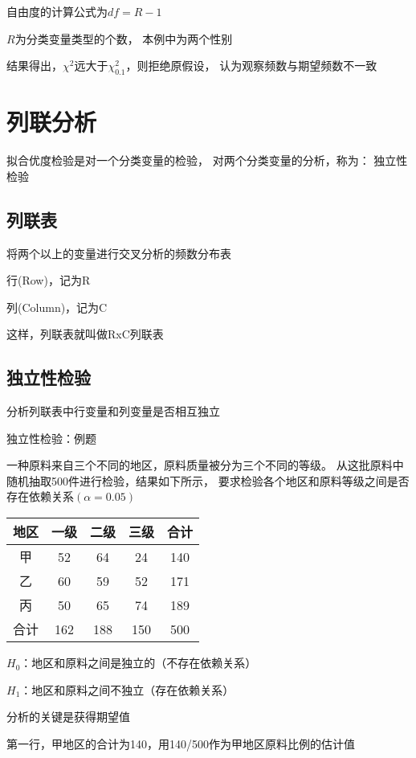 \documentclass[UTF8,10pt]{book}
\begin{document}
{\begin{enumerate}
	自由度的计算公式为$df = R - 1 $
\end{enumerate}  

$R$为分类变量类型的个数，
本例中为两个性别 

结果得出，$\chi^2$远大于$\chi_{0.1}^2$，则拒绝原假设，
认为观察频数与期望频数不一致	

\section{列联分析}
拟合优度检验是对一个分类变量的检验， 对两个分类变量的分析，称为：	独立性检验	

\subsection{列联表}	
将两个以上的变量进行交叉分析的频数分布表 

行(Row)，记为R 

列(Column)，记为C 

这样，列联表就叫做RxC列联表	

\subsection{独立性检验}	
分析列联表中行变量和列变量是否相互独立	

独立性检验：例题 

一种原料来自三个不同的地区，原料质量被分为三个不同的等级。
从这批原料中随机抽取500件进行检验，结果如下所示，
要求检验各个地区和原料等级之间是否存在依赖关系$(\alpha = 0.05)$ 


\begin{tabular}{|c|c|c|c|c|}%
    \hline  %
    地区 & 一级 & 二级 &  三级 & 合计  \\
    \hline  %
    甲 & 52 & 64 & 24 & 140   \\
    \hline %
    乙 &60 &59 &52 &171  \\
    \hline
    丙 &50 &65 &74 &189 \\
    \hline
    合计&162& 188 &150& 500\\
    \hline
    \end{tabular}


$H_0$：地区和原料之间是独立的（不存在依赖关系） 

$H_1$：地区和原料之间不独立（存在依赖关系） 

分析的关键是获得期望值 

第一行，甲地区的合计为140，用140/500作为甲地区原料比例的估计值 

}
\end{document}
